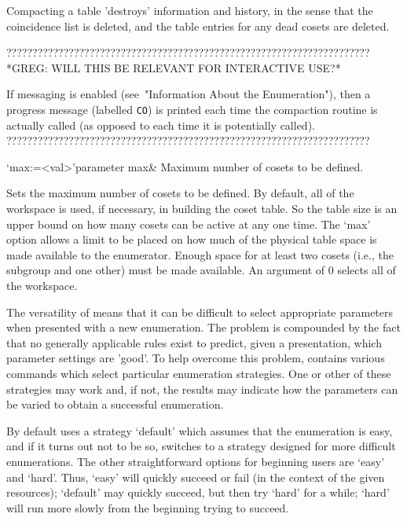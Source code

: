 Compacting a  table 'destroys' information  and history, in  the sense
that the  coincidence list is deleted,  and the table  entries for any
dead cosets are deleted.

??????????????????????????????????????????????????????????????????????
*GREG:
WILL THIS BE RELEVANT FOR INTERACTIVE USE?*

If  messaging is  enabled (see~"Information  About  the Enumeration"),
then a progress  message (labelled {\tt CO}) is  printed each time the
compaction routine is  actually called (as opposed to  each time it is
potentially called).
??????????????????????????????????????????????????????????????????????


    \>`max:=<val>'{parameter max}&
    Maximum number of cosets to be defined.

    Sets the maximum  number of cosets to be defined.   By default, all of
    the workspace is used, if  necessary, in building the coset table.  So
    the table size is  an upper bound on how many cosets  can be active at
    any one  time.  The `max'  option allows a  limit to be placed  on how
    much of the physical table  space is made available to the enumerator.
    Enough  space for  at least  two cosets  (i.e., the  subgroup  and one
    other) must  be made available.  An  argument of 0 selects  all of the
    workspace.

    \enditems



    The versatility  of {\ACE}  means that it  can be difficult  to select
    appropriate  parameters when  presented with  a new  enumeration.  The
    problem is compounded  by the fact that no  generally applicable rules
    exist to  predict, given a presentation, which  parameter settings are
    'good'.   To  help  overcome  this problem,  {\ACE}  contains  various
    commands which select particular enumeration strategies.  One or other
    of these strategies may work and, if not, the results may indicate how
    the parameters can be varied  to obtain a successful enumeration.  

    By default  {\ACE} uses  a strategy `default'  which assumes  that the
    enumeration is easy, and if it turns out not to be so, {\ACE} switches
    to  a strategy designed  for more  difficult enumerations.   The other
    straightforward  options for  beginning users  are `easy'  and `hard'.
    Thus, `easy' will quickly succeed or fail (in the context of the given
    resources); `default' may  quickly succeed, but then try  `hard' for a
    while;  `hard' will  run  more  slowly from  the  beginning trying  to
    succeed.

